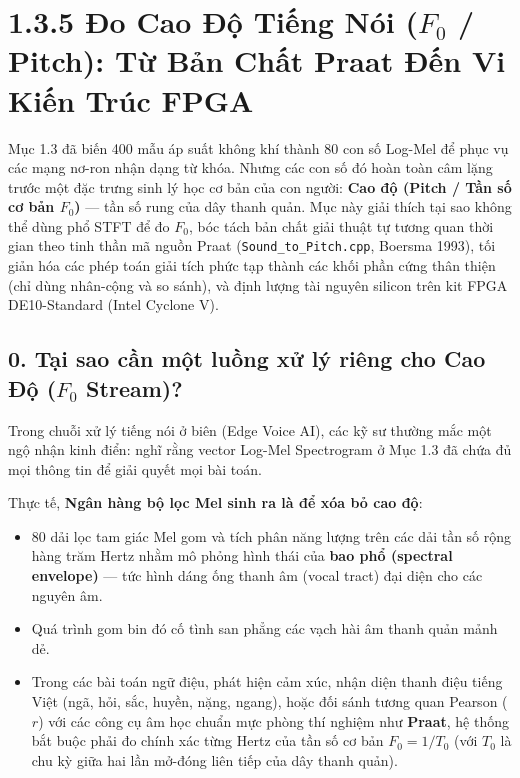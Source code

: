 \documentclass[11pt,a4paper]{article}
\begin{document}
\section*{1.3.5 Đo Cao Độ Tiếng Nói (\texorpdfstring{$F_0$}{F0} / Pitch): Từ Bản Chất Praat Đến Vi Kiến Trúc FPGA}

\begin{learningobj}
Mục 1.3 đã biến 400 mẫu áp suất không khí thành 80 con số Log-Mel để phục vụ các mạng nơ-ron nhận dạng từ khóa. Nhưng các con số đó hoàn toàn câm lặng trước một đặc trưng sinh lý học cơ bản của con người: \textbf{Cao độ (Pitch / Tần số cơ bản $F_0$)} --- tần số rung của dây thanh quản. Mục này giải thích tại sao không thể dùng phổ STFT để đo $F_0$, bóc tách bản chất giải thuật tự tương quan thời gian theo tinh thần mã nguồn Praat (\texttt{Sound\_to\_Pitch.cpp}, Boersma 1993), tối giản hóa các phép toán giải tích phức tạp thành các khối phần cứng thân thiện (chỉ dùng nhân-cộng và so sánh), và định lượng tài nguyên silicon trên kit FPGA DE10-Standard (Intel Cyclone V).
\end{learningobj}

\subsection*{0. Tại sao cần một luồng xử lý riêng cho Cao Độ ($F_0$ Stream)?}

Trong chuỗi xử lý tiếng nói ở biên (Edge Voice AI), các kỹ sư thường mắc một ngộ nhận kinh điển: nghĩ rằng vector Log-Mel Spectrogram ở Mục 1.3 đã chứa đủ mọi thông tin để giải quyết mọi bài toán.

Thực tế, \textbf{Ngân hàng bộ lọc Mel sinh ra là để xóa bỏ cao độ}:
\begin{itemize}
    \setlength{\itemsep}{0.5pt}
    \item 80 dải lọc tam giác Mel gom và tích phân năng lượng trên các dải tần số rộng hàng trăm Hertz nhằm mô phỏng hình thái của \textbf{bao phổ (spectral envelope)} --- tức hình dáng ống thanh âm (vocal tract) đại diện cho các nguyên âm.
    \item Quá trình gom bin đó cố tình san phẳng các vạch hài âm thanh quản mảnh dẻ.
    \item Trong các bài toán ngữ điệu, phát hiện cảm xúc, nhận diện thanh điệu tiếng Việt (ngã, hỏi, sắc, huyền, nặng, ngang), hoặc đối sánh tương quan Pearson ($r$) với các công cụ âm học chuẩn mực phòng thí nghiệm như \textbf{Praat}, hệ thống bắt buộc phải đo chính xác từng Hertz của tần số cơ bản $F_0 = 1 / T_0$ (với $T_0$ là chu kỳ giữa hai lần mở-đóng liên tiếp của dây thanh quản).
\end{itemize}
\end{document}
